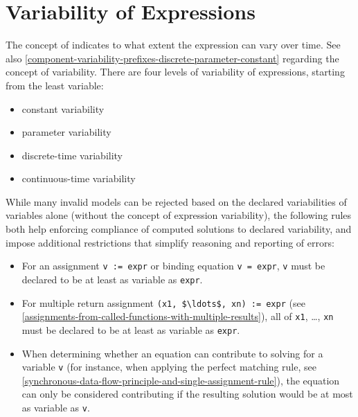 \section{Variability of Expressions}\label{variability-of-expressions}

The concept of  indicates to what extent the expression can vary over time.
See also \cref{component-variability-prefixes-discrete-parameter-constant} regarding the concept of variability.
There are four levels of variability of expressions, starting from the least variable:
\begin{itemize}
\item
  constant variability
\item
  parameter variability
\item
  discrete-time variability
\item
  continuous-time variability
\end{itemize}

While many invalid models can be rejected based on the declared variabilities of variables alone (without the concept of expression variability), the following rules both help enforcing compliance of computed solutions to declared variability, and impose additional restrictions that simplify reasoning and reporting of errors:
\begin{itemize}
\item
  For an assignment \lstinline!v := expr! or binding equation \lstinline!v = expr!, \lstinline!v! must be declared to be at least as variable as \lstinline!expr!.
\item
  For multiple return assignment \lstinline!(x1, $\ldots$, xn) := expr! (see \cref{assignments-from-called-functions-with-multiple-results}), all of \lstinline!x1!, \ldots, \lstinline!xn! must be declared to be at least as variable as \lstinline!expr!.
\item
  When determining whether an equation can contribute to solving for a variable \lstinline!v! (for instance, when applying the perfect matching rule, see \cref{synchronous-data-flow-principle-and-single-assignment-rule}), the equation can only be considered contributing if the resulting solution would be at most as variable as \lstinline!v!.
\end{itemize}


